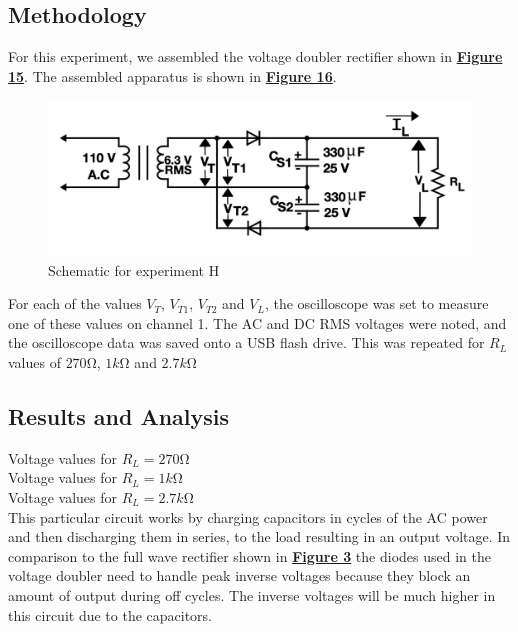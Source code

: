\documentclass[
	letterpaper
	12pt
]{template}
\newcommand{\bref}[2]{\textbf{\hyperref[#1]{#2}}}
\begin{document}
\subsection{Methodology}\label{method::H}
For this experiment, we assembled the voltage doubler rectifier shown in \bref{apparatus::H}{Figure 15}. The assembled apparatus is shown in \bref{apparatus::H}{Figure 16}.
\begin{figure}[H]\label{apparatus::H}
	\centering
	\begin{minipage}[c]{0.45\textwidth}
		\centering
		\includegraphics[width=\textwidth]{figures/H/schematic.png}
		\caption{Schematic for experiment H \\ \protect\cite{labManual}}
	\end{minipage}
\end{figure}
For each of the values $V_T$, $V_{T1}$, $V_{T2}$ and $V_L$, the oscilloscope was set to measure one of these values on channel 1. The AC and DC RMS voltages were noted, and the oscilloscope data was saved onto a USB flash drive. This was repeated for $R_L$ values of $270\unit{\ohm}$, $1\unit{k\ohm}$ and $2.7\unit{k\ohm}$



\subsection{Results and Analysis}
Voltage values for $R_L = 270\unit{\ohm}$\\

Voltage values for $R_L = 1\unit{k\ohm}$\\

Voltage values for $R_L = 2.7\unit{k\ohm}$\\


This particular circuit works by charging capacitors in cycles of the AC power and then discharging them in series, to the load resulting in an output voltage. In comparison to the full wave rectifier shown in \bref{apparatus::B}{Figure 3} the diodes used in the voltage doubler need to handle peak inverse voltages because they block an amount of output during off cycles. The inverse voltages will be much higher in this circuit due to the capacitors.
\end{document}
